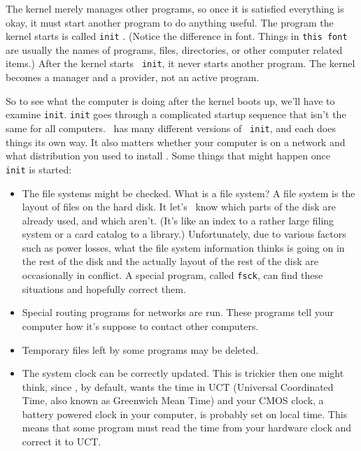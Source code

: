 The kernel merely manages other programs, so once it is satisfied
everything is okay, it must start another program to do anything
useful. The program the kernel starts is called {\tt init}
.  (Notice the difference in font.  Things in {\tt this
  font} are usually the names of programs, files, directories, or
other computer related items.) After the kernel starts {\tt
  init}, it never starts another program. The kernel
becomes a manager and a provider, not an active program.

So to see what the computer is doing after the kernel boots up, we'll
have to examine {\tt init}. {\tt init}
goes through a complicated startup sequence that isn't the same for
all computers.  \linux\ has many different versions of {\tt
  init}, and each does things its own way. It also
matters whether your computer is on a network and what distribution
you used to install \linux. Some things that might happen once {\tt
  init} is started:

\begin{itemize}
\item The file systems might be checked. What is
  a file system?  A file system is the layout of files on the hard
  disk.  It let's \linux\ know which parts of the disk are already
  used, and which aren't.  (It's like an index to a rather large
  filing system or a card catalog to a library.)  Unfortunately, due
  to various factors such as power losses, what the file system
  information thinks is going on in the rest of the disk and the
  actually layout of the rest of the disk are occasionally in
  conflict. A special program, called {\tt fsck}, can find these
  situations and hopefully correct them.

\item Special routing programs for
  networks are run.  These programs tell your
  computer how it's suppose to contact other computers.

\item Temporary files left by some programs may be deleted.

\item The system clock can be correctly updated.  This is trickier
  then one might think, since \unix, by default, wants the time in UCT
  (Universal Coordinated Time, also known as Greenwich Mean Time) and
  your CMOS clock, a battery powered clock in your computer, is
  probably set on local time.  This means that some program must read
  the time from your hardware clock and correct it to UCT.
\end{itemize}

